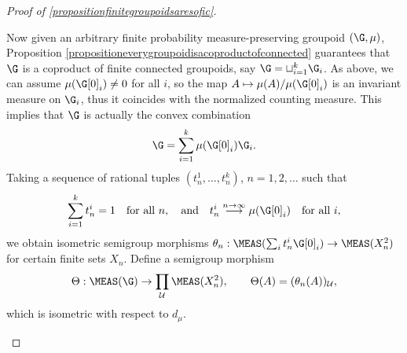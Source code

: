 \begin{proof}[Proof of \ref{propositionfinitegroupoidsaresofic}]
\begin{enumerate}
Now given an arbitrary finite probability measure-preserving groupoid $(\G,\mu)$, Proposition \ref{propositioneverygroupoidisacoproductofconnected} guarantees that $\G$ is a coproduct of finite connected group\-oids, say $\G=\sqcup_{i=1}^k \G_i$. As above, we can assume $\mu(\G[0]_i)\neq 0$ for all $i$, so the map $A\mapsto \mu(A)/\mu(\G[0]_i)$ is an invariant measure on $\G_i$, thus it coincides with the normalized counting measure. This implies that $\G$ is actually the convex combination
\[\G=\sum_{i=1}^k \mu(\G[0]_i)\G_i.\]
Taking a sequence of rational tuples $(t^1_n,\ldots,t^k_n)$, $n=1,2,\ldots$ such that
\[\sum_{i=1}^k t_n^i=1\quad\text{for all }n,\quad\text{and}\quad t^i_n\overset{n\to\infty}{\longrightarrow}\mu(\G[0]_i)\quad\text{for all }i,\]
we obtain isometric semigroup morphisms $\theta_n:\MEAS(\sum_i t^i_n\G[0]_i)\to\MEAS(X_n^2)$ for certain finite sets $X_n$. Define a semigroup morphism
\[\Theta:\MEAS(\G)\to\prod_\mathcal{U}\MEAS(X_n^2),\qquad \Theta(A)=(\theta_n(A))_\mathcal{U},\]
which is isometric with respect to $d_\mu$.\qedhere%
\end{enumerate}
\end{proof}